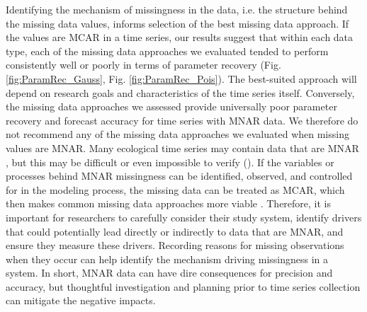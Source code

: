 \documentclass{article}
\begin{document}
Identifying the mechanism of missingness in the data, i.e. the structure behind the missing data values, informs selection of the best missing data approach. If the values are MCAR in a time series, our results suggest that within each data type, each of the missing data approaches we evaluated tended to perform consistently well or poorly in terms of parameter recovery (Fig. \ref{fig:ParamRec_Gauss}, Fig. \ref{fig:ParamRec_Pois}). The best-suited approach will depend on research goals and characteristics of the time series itself. Conversely, the missing data approaches we assessed provide universally poor parameter recovery and forecast accuracy for time series with MNAR data. We therefore do not recommend any of the missing data approaches we evaluated when missing values are MNAR. Many ecological time series may contain data that are MNAR \citep{bowler2025treating}, but this may be difficult or even impossible to verify (\citep{nakagawa_missing_2015}). If the variables or processes behind MNAR missingness can be identified, observed, and controlled for in the modeling process, the missing data can be treated as MCAR, which then makes common missing data approaches more viable \citep{newman_missing_2014, nakagawa_missing_2015}. Therefore, it is important for researchers to carefully consider their study system, identify drivers that could potentially lead directly or indirectly to data that are MNAR, and ensure they measure these drivers. Recording reasons for missing observations when they occur can help identify the mechanism driving missingness in a system. In short, MNAR data can have dire consequences for precision and accuracy, but thoughtful investigation and planning prior to time series collection can mitigate the negative impacts.  
\end{document}

